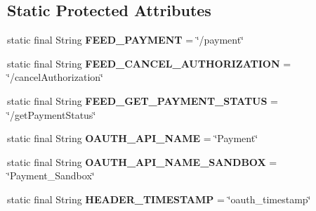 \subsection*{Static Protected Attributes}
\begin{DoxyCompactItemize}
\item 
\hypertarget{classcom_1_1bluevia_1_1payment_1_1client_1_1BVPayment_abf13a7aa4f932106de52a628137052ad}{
static final String {\bfseries FEED\_\-PAYMENT} = \char`\"{}/payment\char`\"{}}
\label{classcom_1_1bluevia_1_1payment_1_1client_1_1BVPayment_abf13a7aa4f932106de52a628137052ad}

\item 
\hypertarget{classcom_1_1bluevia_1_1payment_1_1client_1_1BVPayment_acdf07bba0148a883926a73931856f378}{
static final String {\bfseries FEED\_\-CANCEL\_\-AUTHORIZATION} = \char`\"{}/cancelAuthorization\char`\"{}}
\label{classcom_1_1bluevia_1_1payment_1_1client_1_1BVPayment_acdf07bba0148a883926a73931856f378}

\item 
\hypertarget{classcom_1_1bluevia_1_1payment_1_1client_1_1BVPayment_a5dca445ac6d4affbf361e35e7a9ccd39}{
static final String {\bfseries FEED\_\-GET\_\-PAYMENT\_\-STATUS} = \char`\"{}/getPaymentStatus\char`\"{}}
\label{classcom_1_1bluevia_1_1payment_1_1client_1_1BVPayment_a5dca445ac6d4affbf361e35e7a9ccd39}

\item 
\hypertarget{classcom_1_1bluevia_1_1payment_1_1client_1_1BVPayment_a21fbd5dff69354fe0a5fcdf30096db5f}{
static final String {\bfseries OAUTH\_\-API\_\-NAME} = \char`\"{}Payment\char`\"{}}
\label{classcom_1_1bluevia_1_1payment_1_1client_1_1BVPayment_a21fbd5dff69354fe0a5fcdf30096db5f}

\item 
\hypertarget{classcom_1_1bluevia_1_1payment_1_1client_1_1BVPayment_afa86fc78527840b86b4afb9950c1a27c}{
static final String {\bfseries OAUTH\_\-API\_\-NAME\_\-SANDBOX} = \char`\"{}Payment\_\-Sandbox\char`\"{}}
\label{classcom_1_1bluevia_1_1payment_1_1client_1_1BVPayment_afa86fc78527840b86b4afb9950c1a27c}

\item 
\hypertarget{classcom_1_1bluevia_1_1payment_1_1client_1_1BVPayment_a91a2f50f227084a08e131d0c41167537}{
static final String {\bfseries HEADER\_\-TIMESTAMP} = \char`\"{}oauth\_\-timestamp\char`\"{}}
\label{classcom_1_1bluevia_1_1payment_1_1client_1_1BVPayment_a91a2f50f227084a08e131d0c41167537}

\end{DoxyCompactItemize}


